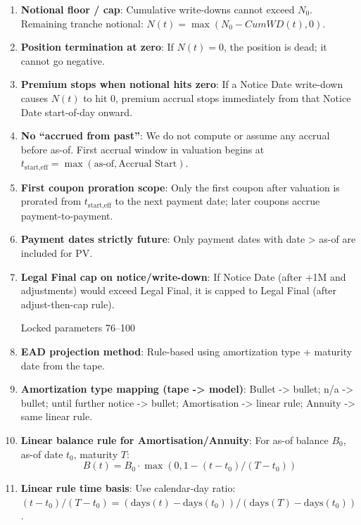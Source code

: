 \documentclass[11pt]{article}
\begin{document}
\begin{enumerate}[label=\arabic*),leftmargin=*,align=left]
\item \textbf{Notional floor / cap}: Cumulative write-downs cannot exceed $N_0$. Remaining tranche notional: $N(t) = \max(N_0 - CumWD(t), 0)$.

\item \textbf{Position termination at zero}: If $N(t)=0$, the position is dead; it cannot go negative.

\item \textbf{Premium stops when notional hits zero}: If a Notice Date write-down causes $N(t)$ to hit 0, premium accrual stops immediately from that Notice Date start-of-day onward.

\item \textbf{No “accrued from past”}: We do not compute or assume any accrual before as-of. First accrual window in valuation begins at $t_{\text{start,eff}} = \max(\text{as-of}, \text{Accrual Start})$.

\item \textbf{First coupon proration scope}: Only the first coupon after valuation is prorated from $t_{\text{start,eff}}$ to the next payment date; later coupons accrue payment-to-payment.

\item \textbf{Payment dates strictly future}: Only payment dates with date > as-of are included for PV.

\item \textbf{Legal Final cap on notice/write-down}: If Notice Date (after +1M and adjustments) would exceed Legal Final, it is capped to Legal Final (after adjust-then-cap rule).

\vspace{1em}
\noindent Locked parameters 76–100
\vspace{0.5em}

\item \textbf{EAD projection method}: Rule-based using amortization type + maturity date from the tape.

\item \textbf{Amortization type mapping (tape -> model)}: Bullet -> bullet; n/a -> bullet; until further notice -> bullet; Amortisation -> linear rule; Annuity -> same linear rule.

\item \textbf{Linear balance rule for Amortisation/Annuity}: For as-of balance $B_0$, as-of date $t_0$, maturity $T$: 
\[ B(t) = B_0 \cdot \max(0, 1 - (t - t_0)/(T - t_0)) \]

\item \textbf{Linear rule time basis}: Use calendar-day ratio: $(t - t_0)/(T - t_0) = (\text{days}(t)-\text{days}(t_0))/(\text{days}(T)-\text{days}(t_0))$.


\end{enumerate}
\end{document}
